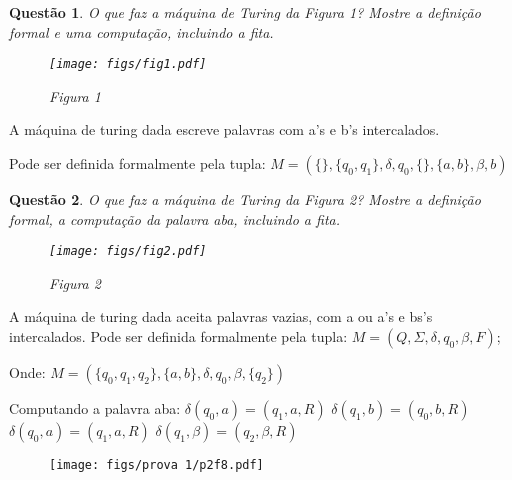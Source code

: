 \documentclass{article}
\newtheorem{problem}{Questão}
\begin{document}
    \begin{problem}
         O que faz a máquina de Turing da Figura 1? Mostre a definição formal e uma computação, incluindo a fita.
         \begin{figure}[H]
             \centering
             \texttt{[image: figs/fig1.pdf]}
             \captionsetup{labelformat=empty}
             \caption{Figura 1}
             \label{fig:1}
         \end{figure}
    \end{problem}
    
    \begin{solution}
        A máquina de turing dada escreve palavras com a’s e b’s intercalados.
        
        Pode ser definida formalmente pela tupla: 
        $M = (\{\}, \{q_0, q_1\}, \delta, q_0, \{\}, \{a, b\}, \beta, b)$
        
    \end{solution}
  
    \begin{problem}
          O que faz a máquina de Turing da Figura 2? Mostre a definição formal, a computação da palavra aba, incluindo a fita.
         \begin{figure}[H]
             \centering
             \texttt{[image: figs/fig2.pdf]}
             \captionsetup{labelformat=empty}
             \caption{Figura 2}
             \label{fig:2}
         \end{figure}
    \end{problem}
    
    \begin{solution}
        A máquina de turing dada aceita palavras vazias, com a ou a’s e bs’s intercalados. Pode ser definida formalmente pela tupla:
        $M = (Q, \Sigma, \delta, q_0, \beta, F)$;
        
        Onde: 
        $M = (\{q_0, q_1, q_2\}, \{a, b\}, \delta, q_0,\beta, \{q_2\})$
        
        Computando a palavra aba:
        \newline
        $\delta(q_0, a) = {(q_1, a, R)}$ \newline
        $\delta(q_1, b) = {(q_0, b, R)}$ \newline
        $\delta(q_0, a) = {(q_1, a, R)}$ \newline
        $\delta(q_1, \beta) = {(q_2, \beta, R)}$
        
        \begin{figure}[H]
             \centering
             \texttt{[image: figs/prova 1/p2f8.pdf]}
        \end{figure}
         
    \end{solution}
    
\end{document}
